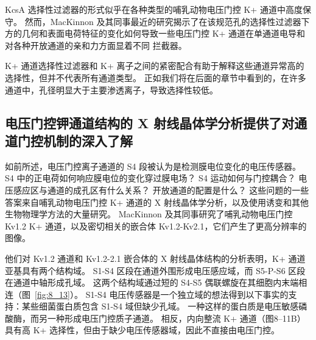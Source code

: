 KcsA 选择性过滤器的形式似乎在各种类型的哺乳动物电压门控 K+ 通道中高度保守。
然而，MacKinnon 及其同事最近的研究揭示了在该规范孔的选择性过滤器下方的几何和表面电荷特征的变化如何导致一些电压门控 K+ 通道在单通道电导和对各种开放通道的亲和力方面显着不同 拦截器。


K+ 通道选择性过滤器和 K+ 离子之间的紧密配合有助于解释这些通道异常高的选择性，但并不代表所有通道类型。
正如我们将在后面的章节中看到的，在许多通道中，孔径明显大于主要渗透离子，导致选择性较低。



\subsection{电压门控钾通道结构的 X 射线晶体学分析提供了对通道门控机制的深入了解}

如前所述，电压门控离子通道的 S4 段被认为是检测膜电位变化的电压传感器。
S4 中的正电荷如何响应膜电位的变化穿过膜电场？
S4 运动如何与门控耦合？
电压感应区与通道的成孔区有什么关系？
开放通道的配置是什么？
这些问题的一些答案来自哺乳动物电压门控 K+ 通道的 X 射线晶体学分析，以及使用诱变和其他生物物理学方法的大量研究。
MacKinnon 及其同事研究了哺乳动物电压门控 Kv1.2 K+ 通道，以及密切相关的嵌合体 Kv1.2-Kv2.1，它们产生了更高分辨率的图像。


他们对 Kv1.2 通道和 Kv1.2-2.1 嵌合体的 X 射线晶体结构的分析表明，K+ 通道亚基具有两个结构域。
S1-S4 区段在通道外围形成电压感应域，而 S5-P-S6 区段在通道中轴形成孔域。
这两个结构域通过短的 S4-S5 偶联螺旋在其细胞内末端相连（图~\ref{fig:8_13}）。
S1-S4 电压传感器是一个独立域的想法得到以下事实的支持：某些细菌蛋白质包含 S1-S4 域但缺少孔域。
一种这样的蛋白质是电压敏感磷酸酶，而另一种形成电压门控质子通道。
相反，内向整流 K+ 通道（图8–11B）具有高 K+ 选择性，但由于缺少电压传感器域，因此不直接由电压门控。


